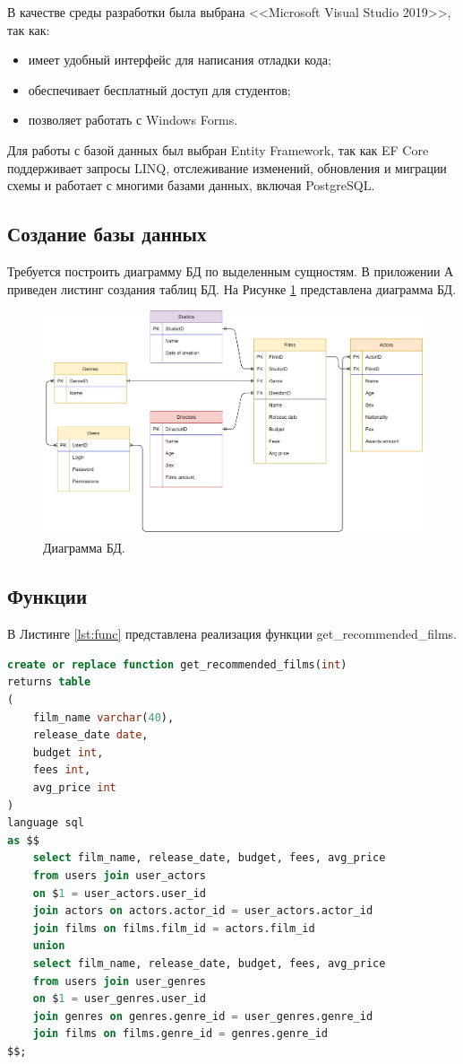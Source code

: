 В качестве среды разработки была выбрана <<Microsoft Visual Studio 2019>>\cite{vs}, так как:
\begin{itemize}
	\item[1)] имеет удобный интерфейс для написания отладки кода;
	\item[2)] обеспечивает бесплатный доступ для студентов;
	\item[3)] позволяет работать с Windows Forms\cite{wf}.  
\end{itemize}
Для работы с базой данных был выбран Entity Framework\cite{efcore}, так как EF Core поддерживает запросы LINQ, отслеживание изменений, обновления и миграции схемы и работает с многими базами данных, включая PostgreSQL.

\subsection{Создание базы данных}
Требуется построить диаграмму БД по выделенным сущностям. В приложении А приведен листинг создания таблиц БД. На Рисунке \ref{img:DB} представлена диаграмма БД. 
\begin{figure}[h!]
	\centering
	\includegraphics[scale=0.25]{img/DB.png}
	\caption{Диаграмма БД.}
	\label{img:DB}
\end{figure}
\newpage

\subsection{Функции}
В Листинге \ref{lst:func} представлена реализация функции get\_recommended\_films.
\begin{lstlisting}[label={lst:func},caption=Реализация функции GetPlayers., language=SQL]
create or replace function get_recommended_films(int)
returns table
(
	film_name varchar(40),
	release_date date,
	budget int,
	fees int,
	avg_price int
)
language sql
as $$
	select film_name, release_date, budget, fees, avg_price
	from users join user_actors
	on $1 = user_actors.user_id
	join actors on actors.actor_id = user_actors.actor_id
	join films on films.film_id = actors.film_id
	union
	select film_name, release_date, budget, fees, avg_price
	from users join user_genres
	on $1 = user_genres.user_id
	join genres on genres.genre_id = user_genres.genre_id
	join films on films.genre_id = genres.genre_id
$$;
\end{lstlisting}

